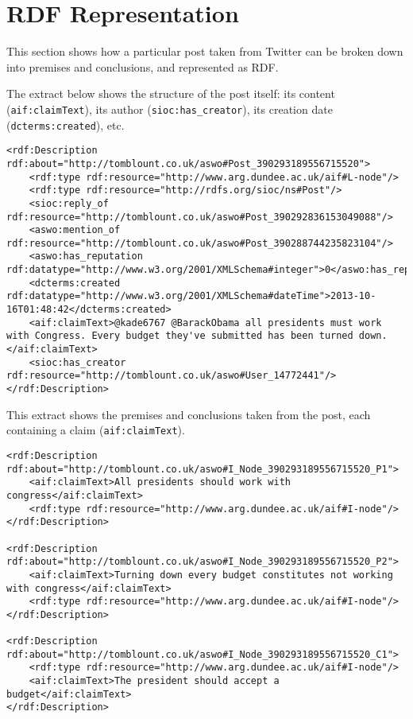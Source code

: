 \newpage
\section{RDF Representation}
This section shows how a particular post taken from Twitter can be broken down into premises and conclusions, and represented as RDF.

The extract below shows the structure of the post itself: its content (\texttt{aif:claimText}), its author (\texttt{sioc:has\_creator}), its creation date (\texttt{dcterms:created}), etc.
\begin{lstlisting}[breaklines]
<rdf:Description rdf:about="http://tomblount.co.uk/aswo#Post_390293189556715520">
    <rdf:type rdf:resource="http://www.arg.dundee.ac.uk/aif#L-node"/>
    <rdf:type rdf:resource="http://rdfs.org/sioc/ns#Post"/>
    <sioc:reply_of rdf:resource="http://tomblount.co.uk/aswo#Post_390292836153049088"/>
    <aswo:mention_of rdf:resource="http://tomblount.co.uk/aswo#Post_390288744235823104"/>
    <aswo:has_reputation rdf:datatype="http://www.w3.org/2001/XMLSchema#integer">0</aswo:has_reputation>
    <dcterms:created rdf:datatype="http://www.w3.org/2001/XMLSchema#dateTime">2013-10-16T01:48:42</dcterms:created>
    <aif:claimText>@kade6767 @BarackObama all presidents must work with Congress. Every budget they've submitted has been turned down.</aif:claimText>
    <sioc:has_creator rdf:resource="http://tomblount.co.uk/aswo#User_14772441"/>
</rdf:Description>
\end{lstlisting}

This extract shows the premises and conclusions taken from the post, each containing a claim (\texttt{aif:claimText}).
\begin{lstlisting}[breaklines]
<rdf:Description rdf:about="http://tomblount.co.uk/aswo#I_Node_390293189556715520_P1">
    <aif:claimText>All presidents should work with congress</aif:claimText>
    <rdf:type rdf:resource="http://www.arg.dundee.ac.uk/aif#I-node"/>
</rdf:Description>
  
<rdf:Description rdf:about="http://tomblount.co.uk/aswo#I_Node_390293189556715520_P2">
    <aif:claimText>Turning down every budget constitutes not working with congress</aif:claimText>
    <rdf:type rdf:resource="http://www.arg.dundee.ac.uk/aif#I-node"/>
</rdf:Description>
  
<rdf:Description rdf:about="http://tomblount.co.uk/aswo#I_Node_390293189556715520_C1">
    <rdf:type rdf:resource="http://www.arg.dundee.ac.uk/aif#I-node"/>
    <aif:claimText>The president should accept a budget</aif:claimText>
</rdf:Description>
\end{lstlisting}

